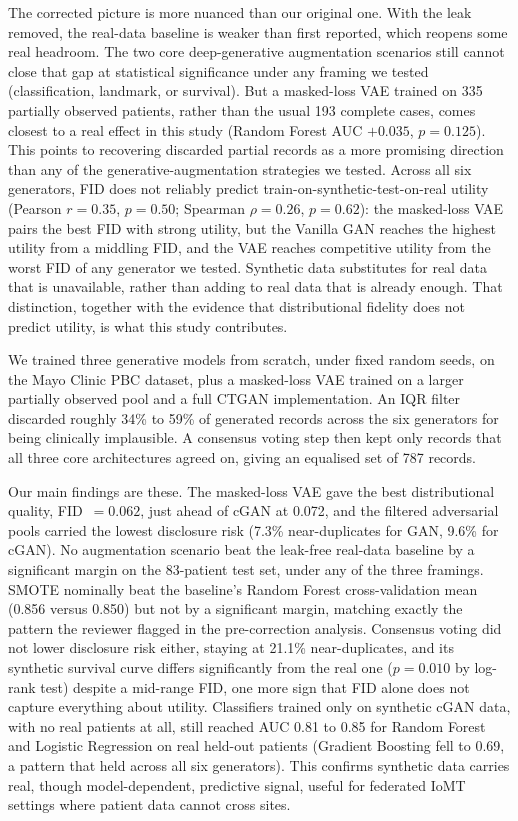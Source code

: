 \documentclass[journal]{IEEEtran}
\begin{document}
The corrected picture is more nuanced than our original one. With the leak removed, the real-data baseline is weaker than first reported, which reopens some real headroom. The two core deep-generative augmentation scenarios still cannot close that gap at statistical significance under any framing we tested (classification, landmark, or survival). But a masked-loss VAE trained on 335 partially observed patients, rather than the usual 193 complete cases, comes closest to a real effect in this study (Random Forest AUC $+0.035$, $p=0.125$). This points to recovering discarded partial records as a more promising direction than any of the generative-augmentation strategies we tested. Across all six generators, FID does not reliably predict train-on-synthetic-test-on-real utility (Pearson $r=0.35$, $p=0.50$; Spearman $\rho=0.26$, $p=0.62$): the masked-loss VAE pairs the best FID with strong utility, but the Vanilla GAN reaches the highest utility from a middling FID, and the VAE reaches competitive utility from the worst FID of any generator we tested. Synthetic data substitutes for real data that is unavailable, rather than adding to real data that is already enough. That distinction, together with the evidence that distributional fidelity does not predict utility, is what this study contributes.

We trained three generative models from scratch, under fixed random seeds, on the Mayo Clinic PBC dataset, plus a masked-loss VAE trained on a larger partially observed pool and a full CTGAN implementation. An IQR filter discarded roughly 34\% to 59\% of generated records across the six generators for being clinically implausible. A consensus voting step then kept only records that all three core architectures agreed on, giving an equalised set of 787 records.

Our main findings are these. The masked-loss VAE gave the best distributional quality, FID~$=0.062$, just ahead of cGAN at 0.072, and the filtered adversarial pools carried the lowest disclosure risk (7.3\% near-duplicates for GAN, 9.6\% for cGAN). No augmentation scenario beat the leak-free real-data baseline by a significant margin on the 83-patient test set, under any of the three framings. SMOTE nominally beat the baseline's Random Forest cross-validation mean (0.856 versus 0.850) but not by a significant margin, matching exactly the pattern the reviewer flagged in the pre-correction analysis. Consensus voting did not lower disclosure risk either, staying at 21.1\% near-duplicates, and its synthetic survival curve differs significantly from the real one ($p=0.010$ by log-rank test) despite a mid-range FID, one more sign that FID alone does not capture everything about utility. Classifiers trained only on synthetic cGAN data, with no real patients at all, still reached AUC 0.81 to 0.85 for Random Forest and Logistic Regression on real held-out patients (Gradient Boosting fell to 0.69, a pattern that held across all six generators). This confirms synthetic data carries real, though model-dependent, predictive signal, useful for federated IoMT settings where patient data cannot cross sites.
\end{document}

